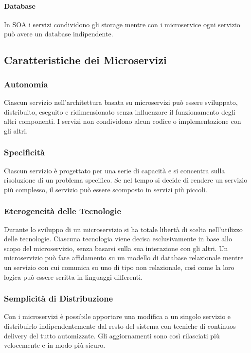 \paragraph{Database} In SOA i servizi condividono gli storage mentre con i microservice ogni servizio può avere un database indipendente.

\subsection{Caratteristiche dei Microservizi}

\subsubsection{Autonomia}
Ciascun servizio nell’architettura basata su microservizi può essere sviluppato, distribuito, eseguito e ridimensionato senza influenzare il funzionamento degli altri componenti. I servizi non condividono alcun codice o implementazione con gli altri.

\subsubsection{Specificità}
Ciascun servizio è progettato per una serie di capacità e si concentra sulla risoluzione di un problema specifico. Se nel tempo si decide di rendere un servizio più complesso, il servizio può essere scomposto in servizi più piccoli.

\subsubsection{Eterogeneità delle Tecnologie}
Durante lo sviluppo di un microservizio si ha totale libertà di scelta nell'utilizzo delle tecnologie. Ciascuna tecnologia viene decisa esclusivamente in base allo scopo del microservizio, senza basarsi sulla sua interazione con gli altri. Un microservizio può fare affidamento su un modello di database relazionale mentre un servizio con cui comunica su uno di tipo non relazionale, così come la loro logica può essere scritta in linguaggi differenti.

\subsubsection{Semplicità di Distribuzione}
Con i microservizi è possibile apportare una modifica a un singolo servizio e distribuirlo indipendentemente dal resto del sistema con tecniche di continuos delivery del tutto automizzate. Gli aggiornamenti sono così rilasciati più velocemente e in modo più sicuro.

